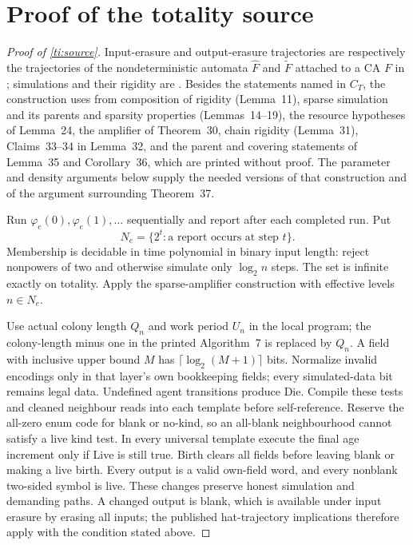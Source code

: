 \section{Proof of the totality source}\label{app:ti-source-proof}

\begin{proof}[Proof of \cref{ti:source}]
Input-erasure and output-erasure trajectories are respectively the trajectories of the nondeterministic automata $\hat F$ and $\tilde F$ attached to a CA $F$ in \cite[Section~2]{Torma15}; simulations and their rigidity are \cite[Definitions~7--8]{Torma15}. Besides the statements named in $C_T$, the construction uses from \cite{Torma15} composition of rigidity (Lemma~11), sparse simulation and its parents and sparsity properties (Lemmas~14--19), the resource hypotheses of Lemma~24, the amplifier of Theorem~30, chain rigidity (Lemma~31), Claims~33--34 in Lemma~32, and the parent and covering statements of Lemma~35 and Corollary~36, which are printed without proof. The parameter and density arguments below supply the needed versions of that construction and of the argument surrounding Theorem~37.

Run $\varphi_e(0),\varphi_e(1),\ldots$ sequentially and report after each completed run. Put
\[
 N_e=\{2^t:\text{a report occurs at step }t\}.
\]
Membership is decidable in time polynomial in binary input length: reject nonpowers of two and otherwise simulate only $\log_2 n$ steps. The set is infinite exactly on totality. Apply the sparse-amplifier construction with effective levels $n\in N_e$.

Use actual colony length $Q_n$ and work period $U_n$ in the local program; the colony-length minus one in the printed Algorithm~7 is replaced by $Q_n$. A field with inclusive upper bound $M$ has $\lceil\log_2(M+1)\rceil$ bits. Normalize invalid encodings only in that layer's own bookkeeping fields; every simulated-data bit remains legal data. Undefined agent transitions produce Die. Compile these tests and cleaned neighbour reads into each template before self-reference. Reserve the all-zero enum code for blank or no-kind, so an all-blank neighbourhood cannot satisfy a live kind test. In every universal template execute the final age increment only if Live is still true. Birth clears all fields before leaving blank or making a live birth. Every output is a valid own-field word, and every nonblank two-sided symbol is live. These changes preserve honest simulation and demanding paths. A changed output is blank, which is available under input erasure by erasing all inputs; the published hat-trajectory implications therefore apply with the condition stated above.


\end{proof}
